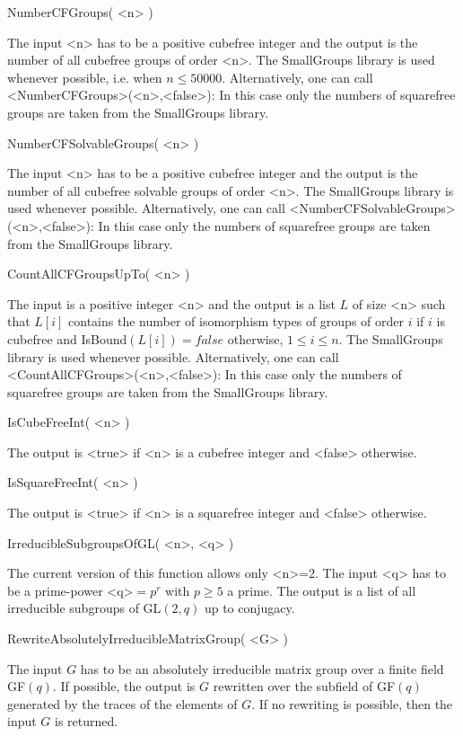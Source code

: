 \>NumberCFGroups( <n> )

The input <n> has to be a positive cubefree integer and the output is the number of all
cubefree groups of order <n>. The SmallGroups library  is used whenever
possible, i.e. when $n\leq 50000$. Alternatively, one can call
<NumberCFGroups>(<n>,<false>): In this case only the numbers of
squarefree groups are taken from the SmallGroups library.


\>NumberCFSolvableGroups( <n> )

The input <n> has to be a positive cubefree integer and the output is the number of all
cubefree solvable groups of order <n>. The SmallGroups library is used whenever
possible. Alternatively, one can call
<NumberCFSolvableGroups>(<n>,<false>): In this case only the numbers of
squarefree groups are taken from the SmallGroups library.


\>CountAllCFGroupsUpTo( <n> )

The input is a positive integer <n> and the output is a list $L$ of size <n> such that
$L[i]$ contains the number of isomorphism types of groups of order $i$ if $i$
is cubefree and IsBound$(L[i])=false$ otherwise, $1\leq i \leq n$. The SmallGroups library is used whenever
possible. Alternatively, one can call <CountAllCFGroups>(<n>,<false>): In this
case only the numbers of
squarefree groups are taken from the SmallGroups library.


\>IsCubeFreeInt( <n> )

The output is <true> if <n> is a cubefree integer and <false> otherwise.


\>IsSquareFreeInt( <n> )

The output is <true> if <n> is a squarefree integer and <false> otherwise.

\>IrreducibleSubgroupsOfGL( <n>, <q> )

The current version of this function allows only <n>=2. The input <q> has to be a prime-power <q>$=p^r$ with $p\geq 5$ a prime. The output
is a list of all irreducible subgroups of GL$(2,q)$ up to conjugacy.

\>RewriteAbsolutelyIrreducibleMatrixGroup( <G> )

The input $G$ has to be an absolutely irreducible matrix group over a finite
field GF$(q)$. If possible, the output is
$G$ rewritten over the subfield of GF$(q)$ generated by the traces of the
elements of $G$. If no rewriting is possible, then the
input $G$ is returned. 



